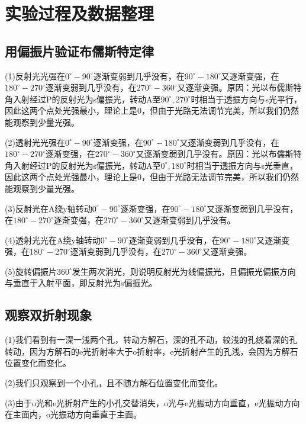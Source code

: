 \documentclass[UTF8]{ctexart}
\begin{document}
	\section{实验过程及数据整理}
	\subsection{用偏振片验证布儒斯特定律}
	(1)反射光光强在$0^{\circ}-90^{\circ}$逐渐变弱到几乎没有，在$90^{\circ}-180^{\circ}$又逐渐变强，在$180^{\circ}-270^{\circ}$逐渐变弱到几乎没有，在$270^{\circ}-360^{\circ}$又逐渐变强。原因：光以布儒斯特角入射经过P的反射光为s偏振光，转动A至$90^{\circ},270^{\circ}$时相当于透振方向与s光平行，因此这两个点处光强最小，理论上是0，但由于光路无法调节完美，所以我们仍然能观察到少量光强。
	\par (2)透射光光强在$0^{\circ}-90^{\circ}$逐渐变强，在$90^{\circ}-180^{\circ}$又逐渐变弱到几乎没有，在$180^{\circ}-270^{\circ}$逐渐变强，在$270^{\circ}-360^{\circ}$又逐渐变弱到几乎没有。原因：光以布儒斯特角入射经过P的反射光为s偏振光，转动A至$0^{\circ},180^{\circ}$时相当于透振方向与s光垂直，因此这两个点处光强最小，理论上是0，但由于光路无法调节完美，所以我们仍然能观察到少量光强。
	\par (3)反射光在A绕y轴转动$0^{\circ}-90^{\circ}$逐渐变强，在$90^{\circ}-180^{\circ}$又逐渐变弱到几乎没有，在$180^{\circ}-270^{\circ}$逐渐变强，在$270^{\circ}-360^{\circ}$又逐渐变弱到几乎没有。
	\par (4)透射光光在A绕y轴转动$0^{\circ}-90^{\circ}$逐渐变弱到几乎没有，在$90^{\circ}-180^{\circ}$又逐渐变强，在$180^{\circ}-270^{\circ}$逐渐变弱到几乎没有，在$270^{\circ}-360^{\circ}$又逐渐变强。
	\par (5)旋转偏振片$360^{\circ}$发生两次消光，则说明反射光为线偏振光，且偏振光偏振方向与垂直于入射平面，即反射光为s偏振光。
	\subsection{观察双折射现象}
	(1)我们看到有一深一浅两个孔，转动方解石，深的孔不动，较浅的孔绕着深的孔转动，因为方解石的e光折射率大于o折射率，e光折射产生的孔浅，会因为方解石位置变化而变化。
	\par (2)我们只观察到一个小孔，且不随方解石位置变化而变化。
	\par (3)由于o光和e光折射产生的小孔交替消失，o光与e光振动方向垂直，e光振动方向在主面内，o光振动方向垂直于主面。
\end{document}
